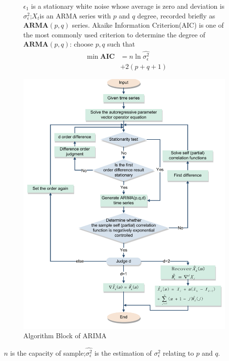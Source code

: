 \documentclass{mcmthesis}
\numberwithin{figure}{section}
\numberwithin{table}{section}
\numberwithin{equation}{section}
\begin{document}
\begin{figure}[ht]
\begin{minipage}[htbp]{0.35\linewidth}
$ \epsilon_1 $ is a stationary white noise whose average is zero and
deviation is $ \sigma_\epsilon^2 $;$ X_t $is an ARMA series with $ p $ and $ q $
degree, recorded briefly as $ \mathbf{ARMA}(p,q) $ series.
Akaike Information Criterion(AIC) is one of the most commonly used
criterion to determine the degree of $ \mathbf{ARMA}(p,q) $: choose 
$ p,q $ such that 
\begin{equation}\label{AIC}
  \begin{aligned}
    \min \mathbf{AIC} &= n\ln \hat{\sigma_\epsilon^2} \\
    &+ 2(p+q+1)
  \end{aligned}
\end{equation}
\end{minipage}
\hfill
\begin{minipage}[htbp]{0.55\linewidth}
  \begin{flushleft}
    \includegraphics[width =11cm]{codes/ARIMA_裁剪页面.pdf}
   \caption{Algorithm Block of ARIMA}\label{ARIMA_ALGO}
  \end{flushleft}
\end{minipage}
\end{figure}
\par
$ n $ is the capacity of sample;$ \hat{\sigma_\epsilon^2} $ is the
estimation of $ \sigma_\epsilon^2 $ relating to $ p $ and $ q $.
\end{document}

